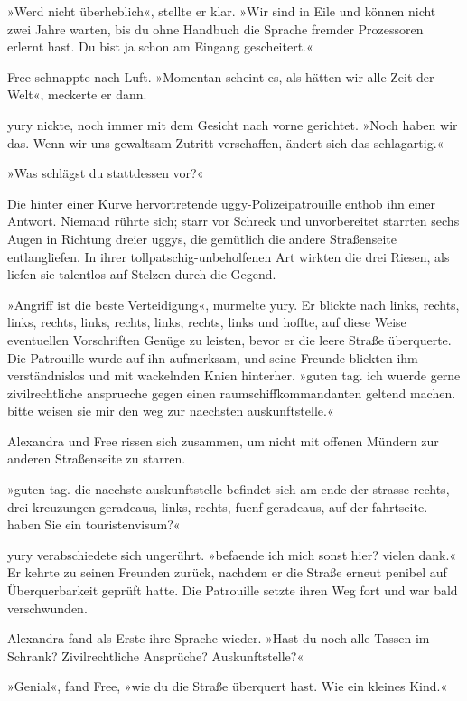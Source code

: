 »Werd nicht überheblich«, stellte er klar. »Wir sind in Eile und können nicht zwei Jahre warten, bis du ohne Handbuch die Sprache fremder Prozessoren erlernt hast. Du bist ja schon am Eingang gescheitert.«

Free schnappte nach Luft. »Momentan scheint es, als hätten wir alle Zeit der Welt«, meckerte er dann.

yury nickte, noch immer mit dem Gesicht nach vorne gerichtet. »Noch haben wir das. Wenn wir uns gewaltsam Zutritt verschaffen, ändert sich das schlagartig.«

»Was schlägst du stattdessen vor?«

Die hinter einer Kurve hervortretende uggy-Polizeipatrouille enthob ihn einer Antwort. Niemand rührte sich; starr vor Schreck und unvorbereitet starrten sechs Augen in Richtung dreier uggys, die gemütlich die andere Straßenseite entlangliefen. In ihrer tollpatschig-unbeholfenen Art wirkten die drei Riesen, als liefen sie talentlos auf Stelzen durch die Gegend.

»Angriff ist die beste Verteidigung«, murmelte yury. Er blickte nach links, rechts, links, rechts, links, rechts, links, rechts, links und hoffte, auf diese Weise eventuellen Vorschriften Genüge zu leisten, bevor er die leere Straße überquerte. Die Patrouille wurde auf ihn aufmerksam, und seine Freunde blickten ihm verständnislos und mit wackelnden Knien hinterher. »guten tag. ich wuerde gerne zivilrechtliche ansprueche gegen einen raumschiffkommandanten geltend machen. bitte weisen sie mir den weg zur naechsten auskunftstelle.«

Alexandra und Free rissen sich zusammen, um nicht mit offenen Mündern zur anderen Straßenseite zu starren.

»guten tag. die naechste auskunftstelle befindet sich am ende der strasse rechts, drei kreuzungen geradeaus, links, rechts, fuenf geradeaus, auf der fahrtseite. haben Sie ein touristenvisum?«

yury verabschiedete sich ungerührt. »befaende ich mich sonst hier? vielen dank.« Er kehrte zu seinen Freunden zurück, nachdem er die Straße erneut penibel auf Überquerbarkeit geprüft hatte. Die Patrouille setzte ihren Weg fort und war bald verschwunden.

Alexandra fand als Erste ihre Sprache wieder. »Hast du noch alle Tassen im Schrank? Zivilrechtliche Ansprüche? Auskunftstelle?«

»Genial«, fand Free, »wie du die Straße überquert hast. Wie ein kleines Kind.«

